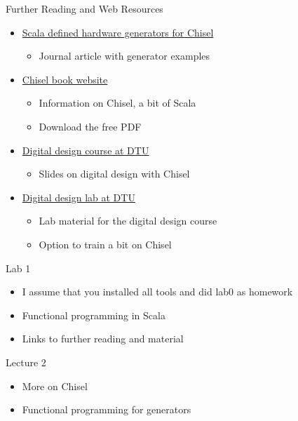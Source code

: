 \begin{frame}[fragile]{Further Reading and Web Resources}
\begin{itemize}
\item \href{https://www.sciencedirect.com/science/article/pii/S014193312500050X}{Scala defined hardware generators for Chisel}
\begin{itemize}
\item Journal article with generator examples
\end{itemize}
\item \href{http://www.imm.dtu.dk/~masca/chisel-book.html}{Chisel book website}
\begin{itemize}
\item Information on Chisel, a bit of Scala
\item Download the free PDF
\end{itemize}
\item \href{http://www2.imm.dtu.dk/courses/02139/}{Digital design course at DTU}
\begin{itemize}
\item Slides on digital design with Chisel
\end{itemize}
\item \href{https://github.com/schoeberl/chisel-lab}{Digital design lab at DTU}
\begin{itemize}
\item Lab material for the digital design course
\item Option to train a bit on Chisel
\end{itemize}
\end{itemize}
\end{frame}


\begin{frame}[fragile]{Lab 1}
\begin{itemize}
\item I assume that you installed all tools and did lab0 as homework
\item Functional programming in Scala
\item Links to further reading and material
\end{itemize}
\end{frame}

\begin{frame}[fragile]{Lecture 2}
\begin{itemize}
\item More on Chisel
\item Functional programming for generators
\end{itemize}
\end{frame}

